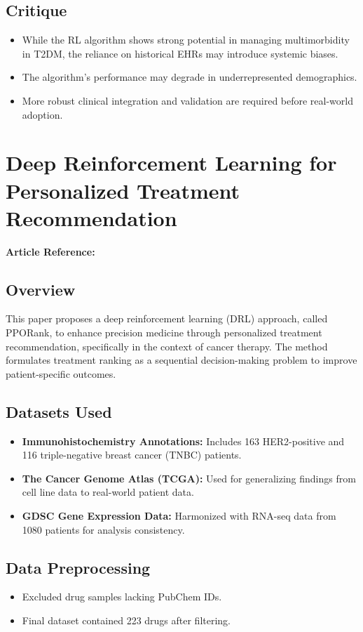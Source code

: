 \subsection*{Critique}
\begin{itemize}
    \item While the RL algorithm shows strong potential in managing multimorbidity in T2DM, the reliance on historical EHRs may introduce systemic biases.
    \item The algorithm's performance may degrade in underrepresented demographics.
    \item More robust clinical integration and validation are required before real-world adoption.
\end{itemize}

\section{Deep Reinforcement Learning for Personalized Treatment Recommendation}
\textbf{Article Reference:} \cite{article_19}

\subsection*{Overview}
This paper proposes a deep reinforcement learning (DRL) approach, called PPORank, to enhance precision medicine through personalized treatment recommendation, specifically in the context of cancer therapy. The method formulates treatment ranking as a sequential decision-making problem to improve patient-specific outcomes.

\subsection*{Datasets Used}
\begin{itemize}
    \item \textbf{Immunohistochemistry Annotations:} Includes 163 HER2-positive and 116 triple-negative breast cancer (TNBC) patients.
    \item \textbf{The Cancer Genome Atlas (TCGA):} Used for generalizing findings from cell line data to real-world patient data.
    \item \textbf{GDSC Gene Expression Data:} Harmonized with RNA-seq data from 1080 patients for analysis consistency.
\end{itemize}

\subsection*{Data Preprocessing}
\begin{itemize}
    \item Excluded drug samples lacking PubChem IDs.
    \item Final dataset contained 223 drugs after filtering.
\end{itemize}

